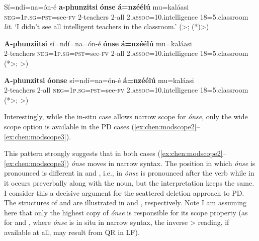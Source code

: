 \documentclass[output=paper,colorlinks,citecolor=brown
]{langscibook}
\begin{document}
\ea\label{ex:chen:modscope}
\begin{xlist}
  \ex
  {\gll S\'{i}=nd\'{i}=na=\'{o}n-\'{e} \textbf{a-phunzitsi} \textbf{\'{o}nse} \textbf{\'{a}=nz\'{e}\'{e}l\'{u}} mu=kal\'{a}asi\\
  \textsc{neg}=1\textsc{p.sg}=\textsc{pst}=see-\textsc{fv} 2-teachers 2-all 2.\textsc{assoc}=10.intelligence 18=5.classroom\\
  \glt \textit{lit}. `I didn't see all intelligent teachers in the classroom.' \hfill{(\neg>\forall; (*)\forall>\neg)}}\label{ex:chen:modscope1}

  \ex
  {\gll \textbf{A-phunziitsi} s\'{i}=nd\'{i}=na=\'{o}n-\'{e} \textbf{\'{o}nse} \textbf{\'{a}=nz\'{e}\'{e}l\'{u}} mu=kal\'{a}asi\\
  2-teachers \textsc{neg}=1\textsc{p.sg}=\textsc{pst}=see-\textsc{fv} 2-all 2.\textsc{assoc}=10.intelligence 18=5.classroom\\}\label{ex:chen:modscope2}\hfill (*\neg>\forall; \forall>\neg)

  \ex
  {\gll \textbf{A-phunzitsi} \textbf{\'{o}onse} s\'{i}=nd\'{i}=na=\'{o}n-\'{e}  \textbf{\'{a}=nz\'{e}\'{e}l\'{u}} mu=kal\'{a}asi\\
  2-teachers 2-all \textsc{neg}=1\textsc{p.sg}=\textsc{pst}=see-\textsc{fv} 2.\textsc{assoc}=10.intelligence 18=5.classroom\\}\label{ex:chen:modscope3}\hfill (*\neg>\forall; \forall>\neg)
\end{xlist}
\z

 Interestingly, while the in-situ case  allows narrow scope for \textit{\'{o}nse}, only the wide scope option is available in the PD cases (\ref{ex:chen:modscope2}--\ref{ex:chen:modscope3}).

This pattern strongly suggests that in both cases (\ref{ex:chen:modscope2}--\ref{ex:chen:modscope3}) \textit{\'{o}nse} moves in narrow syntax. The position in which \textit{\'{o}nse} is pronounced is different in  and , i.e., in  \textit{\'{o}nse} is pronounced after the verb while in  it occurs preverbally along with the noun, but the interpretation keeps the same. I consider this a decisive argument for the scattered deletion approach to PD. The structures of  and  are illustrated in  and , respectively. Note I am assuming here that only the highest copy of \textit{\'{o}nse} is responsible for its scope property (as for  and , where \textit{\'{o}nse} is in situ in narrow syntax, the inverse \forall>\neg {} reading, if available at all, may result from QR in LF).
\end{document}
